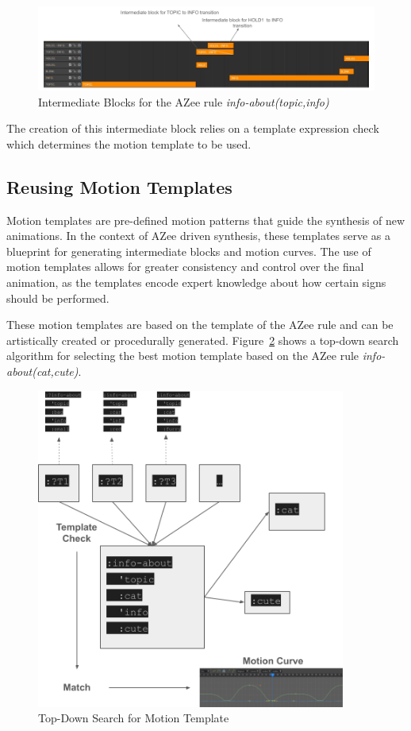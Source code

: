 \documentclass[../../main.tex]{subfiles}
\begin{document}
\begin{figure}
    \centering \includegraphics[width = 5in]{chapters/intermediate_blocks/images/info_about_intermediate_example.png}
    \caption{Intermediate Blocks for the AZee rule \emph{info-about(topic,info)}}
    \label{fig:info_about_intermediate_example}
\end{figure}

The creation of this intermediate block relies on a template expression check which determines the motion template to be used. 

\subsection{Reusing Motion Templates}
\label{ch:intermediate_blocks_pose_correction:reusing_motion_templates}

Motion templates are pre-defined motion patterns that guide the synthesis of new animations. In the context of AZee driven synthesis, these templates serve as a blueprint for generating intermediate blocks and motion curves. The use of motion templates allows for greater consistency and control over the final animation, as the templates encode expert knowledge about how certain signs should be performed.

These motion templates are based on the template of the AZee rule and can be artistically created or procedurally generated. Figure~\ref{fig:top_down_search_template} shows a top-down search algorithm for selecting the best motion template based on the AZee rule \emph{info-about(cat,cute)}.

\begin{figure}
    \centering \includegraphics[width = 4in]{chapters/intermediate_blocks/images/top_down_search_template.png}
    \caption{Top-Down Search for Motion Template}
    \label{fig:top_down_search_template}
\end{figure}
\end{document}
